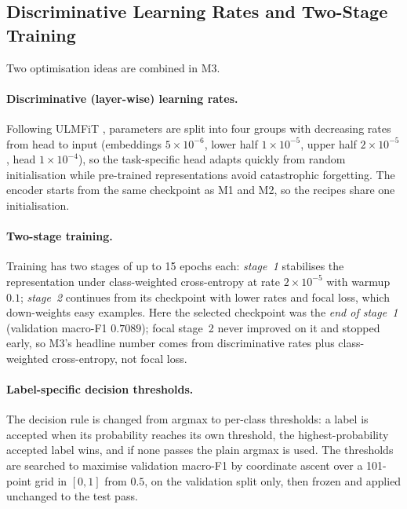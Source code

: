 \subsection{Discriminative Learning Rates and Two-Stage Training}
\label{sec:dlr}

Two optimisation ideas are combined in M3.

\paragraph{Discriminative (layer-wise) learning rates.}
Following ULMFiT \cite{howard2018ulmfit}, parameters are split into four groups
with decreasing rates from head to input (embeddings $5\times10^{-6}$, lower half
$1\times10^{-5}$, upper half $2\times10^{-5}$, head $1\times10^{-4}$), so the
task-specific head adapts quickly from random initialisation while pre-trained
representations avoid catastrophic forgetting.  The encoder starts from the same
checkpoint as M1 and M2, so the recipes share one initialisation.

\paragraph{Two-stage training.}
Training has two stages of up to 15 epochs each: \emph{stage~1} stabilises the
representation under class-weighted cross-entropy at rate $2\times10^{-5}$ with
warmup $0.1$; \emph{stage~2} continues from its checkpoint with lower rates and
focal loss, which down-weights easy examples.  Here the selected
checkpoint was the \emph{end of stage~1} (validation macro-F1 $0.7089$); focal
stage~2 never improved on it and stopped early, so M3's headline number comes from
discriminative rates plus class-weighted cross-entropy, not focal loss.

\paragraph{Label-specific decision thresholds.}
The decision rule is changed from argmax to per-class thresholds: a label is
accepted when its probability reaches its own threshold, the highest-probability
accepted label wins, and if none passes the plain argmax is used.  The thresholds
are searched to maximise validation macro-F1 by coordinate ascent over a
101-point grid in $[0,1]$ from $0.5$, on the validation split only, then frozen
and applied unchanged to the test pass.
